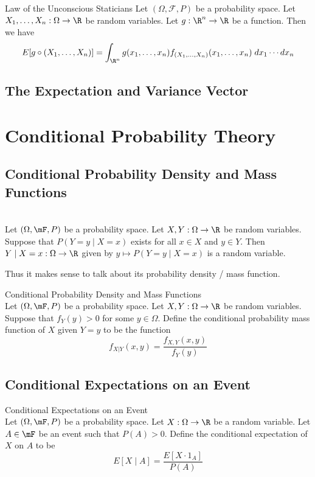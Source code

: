 \documentclass[a4paper]{article}
\begin{document}
\begin{prp}{Law of the Unconscious Staticians}{} Let $(\Omega,\mathcal{F},P)$ be a probability space. Let $X_1,\dots,X_n:\Omega\to\R$ be random variables. Let $g:\R^n\to\R$ be a function. Then we have $$E[g\circ(X_1,\dots,X_n)]=\int_{\R^n}g(x_1,\dots,x_n)f_{(X_1,\dots,X_n)}(x_1,\dots,x_n)\;dx_1\cdots dx_n$$
\end{prp}

\subsection{The Expectation and Variance Vector}

\pagebreak
\section{Conditional Probability Theory}
\subsection{Conditional Probability Density and Mass Functions}
\begin{lmm}{}{}\\
Let $(\Omega,\mF,P)$ be a probability space. Let $X,Y:\Omega\to\R$ be random variables. Suppose that $P(Y=y\;|\;X=x)$ exists for all $x\in X$ and $y\in Y$. Then $Y\;|\;X=x:\Omega\to\R$ given by $y\mapsto P(Y=y\;|\;X=x)$ is a random variable. 
\end{lmm}

Thus it makes sense to talk about its probability density / mass function. 

\begin{defn}{Conditional Probability Density and Mass Functions}{}\\
Let $(\Omega,\mF,P)$ be a probability space. Let $X,Y:\Omega\to\R$ be random variables. Suppose that $f_Y(y)>0$ for some $y\in\Omega$. Define the conditional probability mass function of $X$ given $Y=y$ to be the function $$f_{X|Y}(x,y)=\frac{f_{X,Y}(x,y)}{f_Y(y)}$$
\end{defn}

\subsection{Conditional Expectations on an Event}
\begin{defn}{Conditional Expectations on an Event}{}\\
Let $(\Omega,\mF,P)$ be a probability space. Let $X:\Omega\to\R$ be a random variable. Let $A\in\mF$ be an event such that $P(A)>0$. Define the conditional expectation of $X$ on $A$ to be $$E[X\;|\;A]=\frac{E[X\cdot 1_A]}{P(A)}$$
\end{defn}
\end{document}

